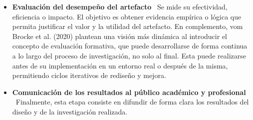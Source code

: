 \begin{itemize}[align=left, label=--]
\item \textbf{Evaluación del desempeño del artefacto} \
Se mide su efectividad, eficiencia o impacto. El objetivo es obtener evidencia empírica o lógica que permita justificar el valor y la utilidad del artefacto.
En complemento, vom Brocke et al. (2020) plantean una visión más dinámica al introducir el concepto de evaluación formativa, que puede desarrollarse de forma continua a lo largo del proceso de investigación, no solo al final. Esta puede realizarse antes de su implementación en un entorno real o después de la misma, permitiendo ciclos iterativos de rediseño y mejora.

\item \textbf{Comunicación de los resultados al público académico y profesional} \
Finalmente, esta etapa consiste en difundir de forma clara los resultados del diseño y de la investigación realizada.
\end{itemize}

